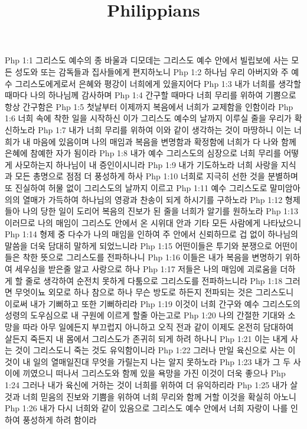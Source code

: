 

\title{Philippians}

Php 1:1  그리스도 예수의 종 바울과 디모데는 그리스도 예수 안에서 빌립보에 사는 모든 성도와 또는 감독들과 집사들에게 편지하노니
Php 1:2  하나님 우리 아버지와 주 예수 그리스도에게로서 은혜와 평강이 너희에게 있을지어다
Php 1:3  내가 너희를 생각할 때마다 나의 하나님께 감사하며
Php 1:4  간구할 때마다 너희 무리를 위하여 기쁨으로 항상 간구함은
Php 1:5  첫날부터 이제까지 복음에서 너희가 교제함을 인함이라
Php 1:6  너희 속에 착한 일을 시작하신 이가 그리스도 예수의 날까지 이루실 줄을 우리가 확신하노라
Php 1:7  내가 너희 무리를 위하여 이와 같이 생각하는 것이 마땅하니 이는 너희가 내 마음에 있음이며 나의 매임과 복음을 변명함과 확정함에 너희가 다 나와 함께 은혜에 참예한 자가 됨이라
Php 1:8  내가 예수 그리스도의 심장으로 너희 무리를 어떻게 사모하는지 하나님이 내 증인이시니라
Php 1:9  내가 기도하노라 너희 사랑을 지식과 모든 총명으로 점점 더 풍성하게 하사
Php 1:10  너희로 지극히 선한 것을 분별하며 또 진실하여 허물 없이 그리스도의 날까지 이르고
Php 1:11  예수 그리스도로 말미암아 의의 열매가 가득하여 하나님의 영광과 찬송이 되게 하시기를 구하노라
Php 1:12  형제들아 나의 당한 일이 도리어 복음의 진보가 된 줄을 너희가 알기를 원하노라
Php 1:13  이러므로 나의 매임이 그리스도 안에서 온 시위대 안과 기타 모든 사람에게 나타났으니
Php 1:14  형제 중 다수가 나의 매임을 인하여 주 안에서 신뢰하므로 겁 없이 하나님의 말씀을 더욱 담대히 말하게 되었느니라
Php 1:15  어떤이들은 투기와 분쟁으로 어떤이들은 착한 뜻으로 그리스도를 전파하나니
Php 1:16  이들은 내가 복음을 변명하기 위하여 세우심을 받은줄 알고 사랑으로 하나
Php 1:17  저들은 나의 매임에 괴로움을 더하게 할 줄로 생각하여 순전치 못하게 다툼으로 그리스도를 전파하느니라
Php 1:18  그러면 무엇이뇨 외모로 하나 참으로 하나 무슨 방도로 하든지 전파되는 것은 그리스도니 이로써 내가 기뻐하고 또한 기뻐하리라
Php 1:19  이것이 너희 간구와 예수 그리스도의 성령의 도우심으로 내 구원에 이르게 할줄 아는고로
Php 1:20  나의 간절한 기대와 소망을 따라 아무 일에든지 부끄럽지 아니하고 오직 전과 같이 이제도 온전히 담대하여 살든지 죽든지 내 몸에서 그리스도가 존귀히 되게 하려 하나니
Php 1:21  이는 내게 사는 것이 그리스도니 죽는 것도 유익함이니라
Php 1:22  그러나 만일 육신으로 사는 이것이 내 일의 열매일진대 무엇을 가릴는지 나는 알지 못하노라
Php 1:23  내가 그 두 사이에 끼였으니 떠나서 그리스도와 함께 있을 욕망을 가진 이것이 더욱 좋으나
Php 1:24  그러나 내가 육신에 거하는 것이 너희를 위하여 더 유익하리라
Php 1:25  내가 살 것과 너희 믿음의 진보와 기쁨을 위하여 너희 무리와 함께 거할 이것을 확실히 아노니
Php 1:26  내가 다시 너희와 같이 있음으로 그리스도 예수 안에서 너희 자랑이 나를 인하여 풍성하게 하려 함이라
